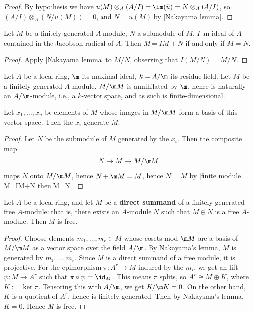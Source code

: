 \begin{proof}
By hypothesis we have $u(M)\otimes_A(A/I)=\im(\tilde{u})=N\otimes_A(A/I)$, so $(A/I)\otimes_A(N/u(M))=0$, and $N=u(M)$ by \cref{Nakayama lemma}.
\end{proof}
\begin{corollary}\label{finite module M=IM+N then M=N}
Let $M$ be a finitely generated $A$-module, $N$ a submodule of $M$, $I$ an ideal of $A$ contained in the Jacobson radical of $A$. Then $M=IM+N$ if and only if $M=N$.
\end{corollary}
\begin{proof}
Apply \cref{Nakayama lemma} to $M/N$, observing that $I(M/N)=M/N$.
\end{proof}
Let $A$ be a local ring, $\m$ its maximal ideal, $k=A/\m$ its residue field. Let $M$ be a finitely generated $A$-module. $M/\m M$ is annihilated by $\m$, hence is naturally an $A/\m$-module, i.e., a $k$-vector space, and as such is finite-dimensional.
\begin{proposition}\label{module generating set in M/mM}
Let $x_1,\dots,x_n$ be elements of $M$ whose images in $M/\m M$ form a basis of this vector space. Then the $x_i$ generate $M$.
\end{proposition}
\begin{proof}
Let $N$ be the submodule of $M$ generated by the $x_i$. Then the composite
map
\[N\to M\to M/\m M\]
maps $N$ onto $M/\m M$, hence $N+\m M=M$, hence $N=M$ by \cref{finite module M=IM+N then M=N}.
\end{proof}
\begin{proposition}\label{local ring module direct summand is free}
Let $A$ be a local ring, and let $M$ be a \textbf{direct summand} of a finitely generated free $A$-module: that is, there exists an $A$-module $N$ such that $M\oplus N$ is a free $A$-module. Then $M$ is free.
\end{proposition}
\begin{proof}
Choose elements $m_1,\dots,m_r\in M$ whose cosets mod $\m M$ are a basis of $M/\m M$ as a vector space over the field $A/\m$. By Nakayama's lemma, $M$ is generated by $m_1,\dots,m_r$. Since $M$ is a direct summand of a free module, it is projective. For the epimorphism $\pi:A^r\to M$ induced by the $m_i$, we get an lift $\psi:M\to A^r$ such that $\pi\circ\psi=\id_M$. This means $\pi$ splits, so $A^r\cong M\oplus K$, where $K:=\ker\pi$. Tensoring this with $A/\m$, we get $K/\m K=0$. On the other hand, $K$ is a quotient of $A^r$, hence is finitely generated. Then by Nakayama's lemma, $K=0$. Hence $M$ is free.
\end{proof}
